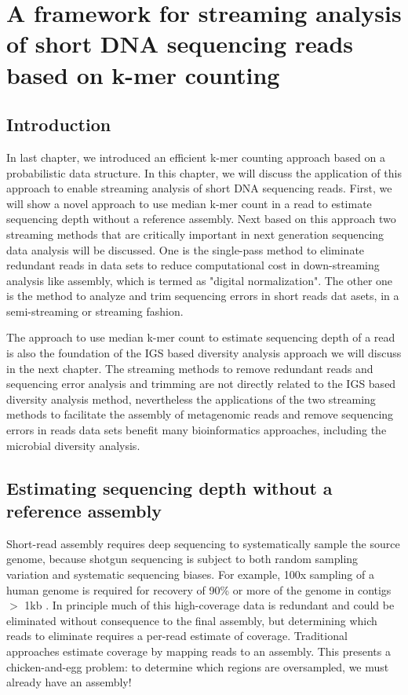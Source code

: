 \chapter{A framework for streaming analysis of short DNA sequencing reads based
on k-mer counting}

\section{Introduction}

In last chapter, we introduced an efficient k-mer counting approach based on a
probabilistic data structure. In this chapter, we will discuss the application
of this approach to enable streaming analysis of short DNA sequencing reads.
First, we will show a novel approach to use median k-mer count in a read to estimate
sequencing depth without a reference assembly. Next based on this approach two
streaming methods that are critically important in next generation sequencing
data analysis will be discussed. One is the single-pass method to eliminate redundant reads in
data sets to reduce computational cost in down-streaming analysis like
assembly, which is termed as "digital normalization". The other one is the
method to analyze and trim sequencing errors in short reads dat asets, in a
semi-streaming or streaming fashion.

The approach to use median k-mer count to estimate sequencing depth of a read is
also the foundation of the IGS based diversity analysis approach we will
discuss in the next chapter. The streaming methods to remove redundant reads
and sequencing error analysis and trimming are not directly related to the IGS
based diversity analysis method, nevertheless the applications of the two
streaming methods to facilitate the assembly of metagenomic reads and remove
sequencing errors in reads data sets benefit many bioinformatics approaches,
including the microbial diversity analysis.
% 
\section{Estimating sequencing depth without a reference assembly}

Short-read assembly requires deep sequencing to systematically sample the
source genome, because shotgun sequencing is subject to both random sampling
variation and systematic sequencing biases.  For example, 100x sampling of a
human genome is required for recovery of 90\% or more of the genome in contigs
$>$ 1kb \cite{pubmed21187386}. In principle much of this high-coverage data is
redundant and could be eliminated without consequence to the final assembly,
but determining which reads to eliminate requires a per-read estimate of
coverage. Traditional approaches estimate coverage by mapping reads to an
assembly.  This presents a chicken-and-egg problem: to determine which regions
are oversampled, we must already have an assembly!


